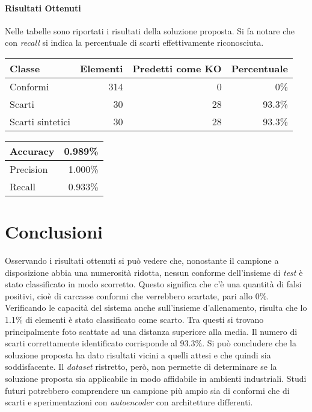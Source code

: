 \documentclass[a0,portrait]{a0poster}
\begin{document}
\begin{multicols}{2}
\paragraph{Risultati Ottenuti}
Nelle tabelle sono riportati i risultati della soluzione proposta.
Si fa notare che con \textit{recall} si indica la percentuale di scarti effettivamente riconosciuta.
\\
[1cm]
\begin{minipage}[c]{0.37\textwidth}
  \begin{tabular}{||l r r r||}
    \hline
    Classe           & Elementi & Predetti come KO & Percentuale \\ \hline \hline
    Conformi         & 314      & 0                & 0\%         \\ \hline
    Scarti           & 30       & 28               & 93.3\%      \\ \hline
    Scarti sintetici & 30       & 28               & 93.3\%      \\ \hline
  \end{tabular}
\end{minipage}
\begin{minipage}[c]{0.20\textwidth}
  \begin{tabular}{||l r||}
    \hline
    Accuracy  & 0.989\% \\ \hline
    Precision & 1.000\% \\ \hline
    Recall    & 0.933\% \\ \hline
  \end{tabular}
\end{minipage}

\section*{Conclusioni}
Osservando i risultati ottenuti si può vedere che, nonostante il campione a disposizione abbia una numerosità ridotta, nessun conforme dell'insieme di \textit{test} è stato classificato in modo scorretto.
Questo significa che c'è una quantità di falsi positivi, cioè di carcasse conformi che verrebbero scartate, pari allo 0\%.
Verificando le capacità del sistema anche sull'insieme d'allenamento, risulta che lo 1.1\% di elementi è stato classificato come scarto.
Tra questi si trovano principalmente foto scattate ad una distanza superiore alla media.
Il numero di scarti correttamente identificato corrisponde al 93.3\%.
Si può concludere che la soluzione proposta ha dato risultati vicini a quelli attesi e che quindi sia soddisfacente.
Il \textit{dataset} ristretto, però, non permette di determinare se la soluzione proposta sia applicabile in modo affidabile in ambienti industriali.
Studi futuri potrebbero comprendere un campione più ampio sia di conformi che di scarti e sperimentazioni con \textit{autoencoder} con architetture differenti.

\end{multicols}
\end{document}

